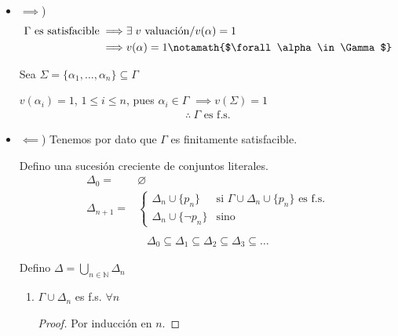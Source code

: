 \begin{itemize}[align=right]
    \item $\implies$)
        \begin{align*}
            \Gamma \text{ es satisfacible} \implies& \exists \; v 
            \text{ valuación} / v(\alpha) = 1 \\
            \implies& v(\alpha)=1 \notamath{$\forall \alpha \in \Gamma$}
        \end{align*}

        Sea $\Sigma = \{ \alpha_1, \dotsc, \alpha_n \} \subseteq \Gamma$

        $v(\alpha_i) = 1$, $1 \leq i \leq n$, pues $\alpha_i \in \Gamma$
        $\implies v(\Sigma)=1$
        \begin{gather*}
            \therefore ~ \Gamma \text{ es f.s.}
        \end{gather*}

    \item $\impliedby$) Tenemos por dato que $\Gamma$ es finitamente 
        satisfacible.

        Defino una sucesión creciente de conjuntos literales.
        \begin{align*}
            \Delta_0 =& \varnothing \\
            \Delta_{n+1} =& 
            \begin{cases}
                \Delta_n \cup \{ p_n \} & \text{si } \Gamma \cup \Delta_n
                                        \cup \{ p_n \} \text{ es f.s.}\\
                \Delta_n \cup \{ \neg p_n \} & \text{sino}
            \end{cases} \\
        \end{align*}    
        \begin{gather*}
            \Delta_0 \subseteq \Delta_1 \subseteq \Delta_2 \subseteq \Delta_3
            \subseteq \dots
        \end{gather*}


        Defino $\Delta = \bigcup_{n \in \mathbb{N}} \Delta_n$

       \begin{enumerate}
           \item $\Gamma \cup \Delta_n$ es f.s. $\forall n$

            \begin{proof}
            Por inducción en $n$.


\end{proof}
\end{enumerate}
\end{itemize}
